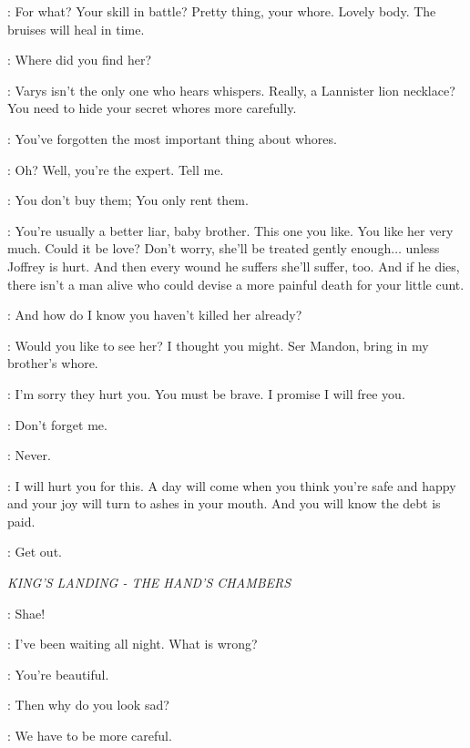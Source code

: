 \CERSEI: For what? Your skill in battle? Pretty thing, your whore. Lovely body. The bruises will heal in time. 

\TYRION: Where did you find her? 

\CERSEI: Varys isn't the only one who hears whispers. Really, a Lannister lion necklace? You need to hide your secret whores more carefully. 

\TYRION: You've forgotten the most important thing about whores. 

\CERSEI: Oh? Well, you're the expert. Tell me. 

\TYRION: You don't buy them; You only rent them. 

\CERSEI: You're usually a better liar, baby brother. This one you like. You like her very much. Could it be love? Don't worry, she'll be treated gently enough$\ldots$ unless Joffrey is hurt. And then every wound he suffers she'll suffer, too. And if he dies, there isn't a man alive who could devise a more painful death for your little cunt. 

\TYRION: And how do I know you haven't killed her already? 

\CERSEI: Would you like to see her? I thought you might. Ser Mandon, bring in my brother's whore. 


\TYRION: I'm sorry they hurt you. You must be brave. I promise I will free you. 

\ROS: Don't forget me. 

\TYRION: Never. 


\TYRION: I will hurt you for this. A day will come when you think you're safe and happy and your joy will turn to ashes in your mouth. And you will know the debt is paid. 

\CERSEI: Get out. 


\scene

\textit{KING'S LANDING - THE HAND'S CHAMBERS} 


\TYRION: Shae! 

\SHAE: I've been waiting all night. What is wrong? 

\TYRION: You're beautiful. 

\SHAE: Then why do you look sad? 

\TYRION: We have to be more careful. 

